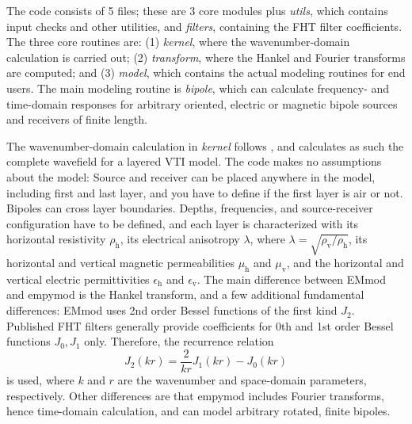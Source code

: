 \documentclass[manuscript,revised]{geophysics}
\begin{document}
The code consists of 5 files; these are 3 core modules plus \emph{utils}, which
contains input checks and other utilities, and \emph{filters}, containing the
FHT filter coefficients. The three core routines are: (1) \emph{kernel}, where
the wavenumber-domain calculation is carried out; (2) \emph{transform}, where
the Hankel and Fourier transforms are computed; and (3) \emph{model}, which
contains the actual modeling routines for end users. The main modeling routine
is \emph{bipole}, which can calculate frequency- and time-domain responses for
arbitrary oriented, electric or magnetic bipole sources and receivers of finite
length.

The wavenumber-domain calculation in \emph{kernel} follows
\cite{GEO.15.Hunziker}, and calculates as such the complete wavefield for a
layered VTI model. The code makes no assumptions about the model: Source and
receiver can be placed anywhere in the model, including first and last layer,
and you have to define if the first layer is air or not. Bipoles can cross
layer boundaries. Depths, frequencies, and source-receiver configuration have
to be defined, and each layer is characterized with its horizontal resistivity
$\rho_\textrm{h}$, its electrical anisotropy $\lambda$, where $\lambda =
\sqrt{\rho_\textrm{v}/\rho_\textrm{h}}$, its horizontal and vertical magnetic
permeabilities $\mu_\mathrm{h}$ and $\mu_\mathrm{v}$, and the horizontal and
vertical electric permittivities $\epsilon_\mathrm{h}$ and
$\epsilon_\mathrm{v}$. The main difference between EMmod and empymod is the
Hankel transform, and a few additional fundamental differences: EMmod uses 2nd
order Bessel functions of the first kind $J_2$. Published FHT filters
generally provide coefficients for 0th and 1st order Bessel functions $J_0,
J_1$ only. Therefore, the recurrence relation
%
\begin{equation}
  J_2(kr) = \frac{2}{kr}J_1(kr) - J_0(kr)
  \label{eq:j2}
\end{equation}
%
is used, where $k$ and $r$ are the wavenumber and space-domain parameters,
respectively. Other differences are that empymod includes Fourier transforms,
hence time-domain calculation, and can model arbitrary rotated, finite bipoles.
\end{document}
